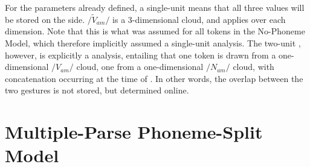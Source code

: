 For the  parameters already defined, a single-unit 
means that all three values will be stored on the  side.
$/\tilde{V}_{am}/$ is a 3-dimensional cloud, and  applies
over each dimension. Note that this is what was assumed for all tokens
in the No-Phoneme Model, which therefore implicitly assumed a single-unit
analysis. The two-unit , however, is explicitly a 
analysis, entailing that one token is drawn from a one-dimensional
\emph{$/V_{am}/$} cloud, one from a one-dimensional \emph{$/N_{am}/$}
cloud, with concatenation occurring at the time of . In
other words, the overlap between the two gestures is not stored, but
determined online. 

\section{Multiple-Parse Phoneme-Split Model}

